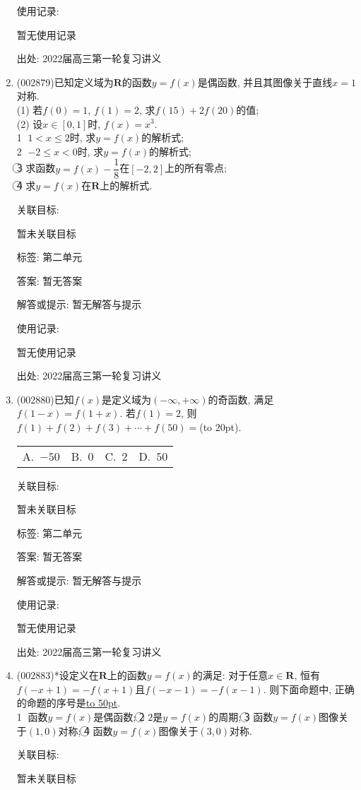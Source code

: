 \documentclass[10pt,a4paper]{article}
\newcommand{\blank}[1]{\underline{\hbox to #1pt{}}}
\newcommand{\bracket}[1]{(\hbox to #1pt{})}
\newcommand{\fourch}[4]{\par\begin{tabular}{p{.23\textwidth}p{.23\textwidth}p{.23\textwidth}p{.23\textwidth}}
A.~#1 &B.~#2& C.~#3& D.~#4
\end{tabular}}
\begin{document}
\begin{enumerate}[1.]
使用记录:

暂无使用记录


出处: 2022届高三第一轮复习讲义
\item { (002879)}已知定义域为$\mathbf{R}$的函数$y=f(x)$是偶函数, 并且其图像关于直线$x=1$对称.\\
(1) 若$f(0)=1$, $f(1)=2$, 求$f(15)+2f(20)$的值;\\
(2) 设$x\in [0,1]$时, $f(x)=x^3$.\\
\textcircled{1} $1<x\le 2$时, 求$y=f(x)$的解析式;\\
\textcircled{2} $-2\le x<0$时, 求$y=f(x)$的解析式;\\
\textcircled{3} 求函数$y=f(x)-\dfrac 18$在$[-2,2]$上的所有零点;\\
\textcircled{4} 求$y=f(x)$在$\mathbf{R}$上的解析式.


关联目标:

暂未关联目标



标签: 第二单元

答案: 暂无答案

解答或提示: 暂无解答与提示

使用记录:

暂无使用记录


出处: 2022届高三第一轮复习讲义
\item { (002880)}已知$f(x)$是定义域为$(-\infty,+\infty)$的奇函数, 满足$f(1-x)=f(1+x)$. 若$f(1)=2$, 则$f(1)+f(2)+f(3)+\cdots +f(50)=$\bracket{20}.
\fourch{$-50$}{$0$}{$2$}{$50$}


关联目标:

暂未关联目标



标签: 第二单元

答案: 暂无答案

解答或提示: 暂无解答与提示

使用记录:

暂无使用记录


出处: 2022届高三第一轮复习讲义
\item { (002883)}*设定义在$\mathbf{R}$上的函数$y=f(x)$的满足: 对于任意$x\in \mathbf{R}$, 恒有$f(-x+1)=-f(x+1)$且$f(-x-1)=-f(x-1)$. 则下面命题中, 正确的命题的序号是\blank{50}.\\
\textcircled{1} 函数$y=f(x)$是偶函数; \textcircled{2} $2$是$y=f(x)$的周期; \textcircled{3} 函数$y=f(x)$图像关于$(1,0)$对称; \textcircled{4} 函数$y=f(x)$图像关于$(3,0)$对称.


关联目标:

暂未关联目标




\end{enumerate}
\end{document}
